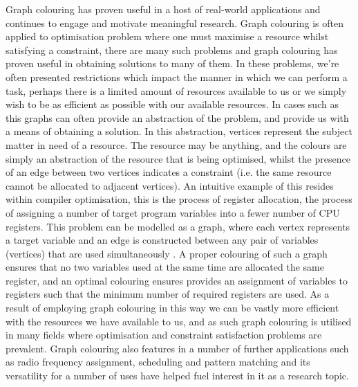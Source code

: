 \documentclass[12pt,a4paper]{article}
\begin{document}
\par Graph colouring has proven useful in a host of real-world applications and continues to engage and motivate meaningful research. Graph colouring is often applied to optimisation problem where one must maximise a resource whilst satisfying a constraint, there are many such problems and graph colouring has proven useful in obtaining solutions to many of them. In these problems, we're often presented restrictions which impact the manner in which we can perform a task, perhaps there is a limited amount of resources available to us or we simply wish to be as efficient as possible with our available resources. In cases such as this graphs can often provide an abstraction of the problem, and provide us with a means of obtaining a solution. In this abstraction, vertices represent the subject matter in need of a resource. The resource may be anything, and the colours are simply an abstraction of the resource that is being optimised, whilst the presence of an edge between two vertices indicates a constraint (i.e. the same resource cannot be allocated to adjacent vertices). An intuitive example of this resides within compiler optimisation, this is the process of register allocation, the process of assigning a number of target program variables into a fewer number of CPU registers. This problem can be modelled as a graph, where each vertex represents a target variable and an edge is constructed between any pair of variables (vertices) that are used simultaneously \cite{Chaitin}. A proper colouring of such a graph ensures that no two variables used at the same time are allocated the same register, and an optimal colouring ensures provides an assignment of variables to registers such that the minimum number of required registers are used. As a result of employing graph colouring in this way we can be vastly more efficient with the resources we have available to us, and as such graph colouring is utilised in many fields where optimisation and constraint satisfaction problems are prevalent. Graph colouring also features in a number of further applications such as radio frequency assignment, scheduling and pattern matching and its versatility for a number of uses have helped fuel interest in it as a research topic.
\end{document}
